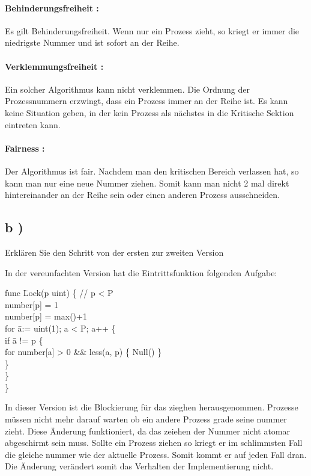 \paragraph{ Behinderungsfreiheit : } Es gilt Behinderungsfreiheit. Wenn nur ein Prozess zieht, so kriegt er immer die niedrigste Nummer und ist sofort an der Reihe.

\paragraph{ Verklemmungsfreiheit : } Ein solcher Algorithmus kann nicht verklemmen. Die Ordnung der Prozessnummern erzwingt, dass ein Prozess immer an der Reihe ist. Es kann keine Situation geben, in der kein Prozess als nächstes in die Kritische Sektion eintreten kann.

\paragraph{ Fairness : } Der Algorithmus ist fair. Nachdem man den kritischen Bereich verlassen hat, so kann man nur eine neue Nummer ziehen. Somit kann man nicht 2 mal direkt hintereinander an der Reihe sein oder einen anderen Prozess ausschneiden.


\subsection*{  b ) }

Erklären Sie den Schritt von der ersten zur zweiten Version

In der vereunfachten Version hat die Eintrittsfunktion folgenden Aufgabe:

\begin{mylisting}
\begin{tabbing}

func \= Lock(p uint) \{ // p < P \\
\>	number[p] = 1 \\
\>	number[p] = max()+1 \\
\>	for \= a:= uint(1); a < P; a++ \{ \\
\>	\>	if \= a != p \{ \\
\>	\>	\>	for number[a] > 0 \&\& less(a, p) \{ Null() \} \\
\>	\>	\} \\
\>	\} \\
\} \\

\end{tabbing}
\end{mylisting}

In dieser Version ist die Blockierung für das zieghen herausgenommen. Prozesse müssen nicht mehr darauf warten ob ein andere Prozess grade seine nummer zieht. Diese Änderung funktioniert, da das zeiehen der Nummer nicht atomar abgeschirmt sein muss. Sollte ein Prozess ziehen so kriegt er im schlimmsten Fall die gleiche nummer wie der aktuelle Prozess. Somit kommt er auf jeden Fall dran. Die Änderung verändert somit das Verhalten der Implementierung nicht.